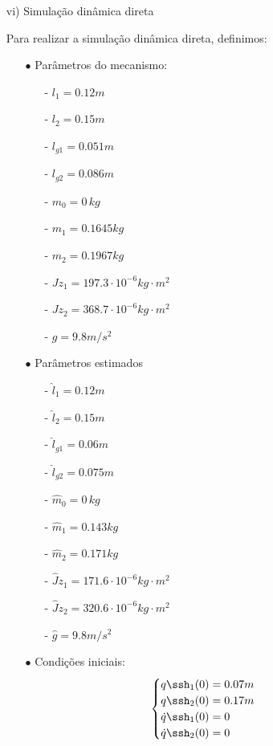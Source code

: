 \documentclass[]{politex}
\begin{document}
\begin{itemize}
\item[vi)] Simulação dinâmica direta

Para realizar a simulação dinâmica direta, definimos:

\begin{itemize}

\item[$\bullet$] Parâmetros do mecanismo:
\begin{multicols}{2}
\begin{itemize}
\item[-] $l_1 = 0.12 m$
\item[-] $l_2 = 0.15 m$
\item[-] $l_{g1} = 0.051 m$
\item[-] $l_{g2} = 0.086 m$
\item[-] $m_0 = 0 \, kg$
\item[-] $m_1 = 0.1645 kg$
\item[-] $m_2 = 0.1967 kg$
\item[-] $Jz_1 = 197.3 \cdot 10^{-6} kg\cdot m^2$
\item[-] $Jz_2 = 368.7 \cdot 10^{-6} kg\cdot m^2$
\item[-] $g = 9.8 m/s^2$
\end{itemize}
\end{multicols}

\item[$\bullet$] Parâmetros estimados
\begin{multicols}{2}
\begin{itemize}
\item[-] $\hat{l}_1 = 0.12 m$
\item[-] $\hat{l}_2 = 0.15 m$
\item[-] $\hat{l}_{g1} = 0.06 m$
\item[-] $\hat{l}_{g2} = 0.075 m$
\item[-] $\hat{m}_0 = 0 \, kg$
\item[-] $\hat{m}_1 = 0.143 kg$
\item[-] $\hat{m}_2 = 0.171 kg$
\item[-] $\hat{J}z_1 = 171.6 \cdot 10^{-6} kg\cdot m^2$
\item[-] $\hat{J}z_2 = 320.6 \cdot 10^{-6} kg\cdot m^2$
\item[-] $\hat{g} = 9.8 m/s^2$
\end{itemize}
\end{multicols}

\item[$\bullet$] Condições iniciais:
\begin{equation}
\begin{cases}
q\ssh_1(0) = 0.07 m\\
q\ssh_2(0) = 0.17 m \\
\dot{q}\ssh_1(0) = 0 \\
\dot{q}\ssh_2(0) = 0 \\
\end{cases}
\end{equation}


\end{itemize}
\end{itemize}
\end{document}
